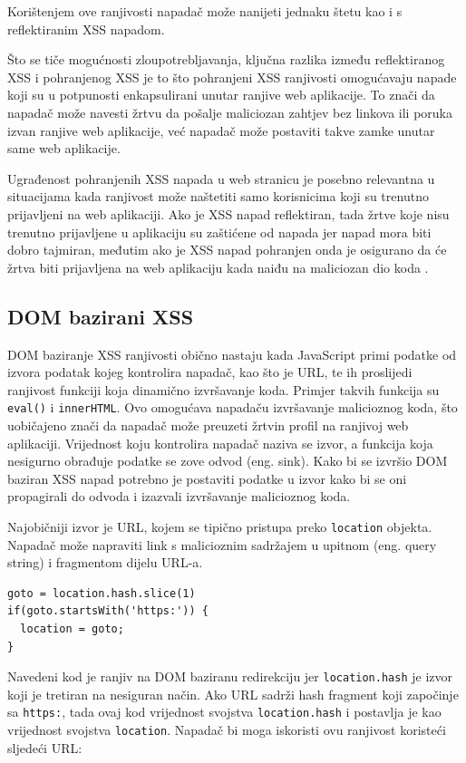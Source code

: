 \documentclass[12pt, oneside, onecolumn]{book}
\begin{document}
{Korištenjem ove ranjivosti napadač može nanijeti jednaku štetu kao i s reflektiranim XSS napadom. 

Što se tiče mogućnosti zloupotrebljavanja, ključna razlika između reflektiranog XSS i pohranjenog XSS je to što pohranjeni XSS ranjivosti omogućavaju napade koji su u potpunosti enkapsulirani unutar ranjive web aplikacije. To znači da napadač može navesti žrtvu da pošalje maliciozan zahtjev bez linkova ili poruka izvan ranjive web aplikacije, već napadač može postaviti takve zamke unutar same web aplikacije. 

Ugrađenost pohranjenih XSS napada u web stranicu je posebno relevantna u situacijama kada ranjivost može naštetiti samo korisnicima koji su trenutno prijavljeni na web aplikaciji. Ako je XSS napad reflektiran, tada žrtve koje nisu trenutno prijavljene u aplikaciju su zaštićene od napada jer napad mora biti dobro tajmiran, međutim ako je XSS napad pohranjen onda je osigurano da će žrtva biti prijavljena na web aplikaciju kada naiđu na maliciozan dio koda \cite{xssstor}.

\subsection{DOM bazirani XSS}
DOM baziranje XSS ranjivosti obično nastaju kada JavaScript primi podatke od izvora podatak kojeg kontrolira napadač, kao što je URL, te ih proslijedi ranjivost funkciji koja dinamično izvršavanje koda. Primjer takvih funkcija su \texttt{eval()} i \texttt{innerHTML}. Ovo omogućava napadaču izvršavanje malicioznog koda, što uobičajeno znači da napadač može preuzeti žrtvin profil na ranjivoj web aplikaciji. Vrijednost koju kontrolira napadač naziva se izvor, a funkcija koja nesigurno obrađuje podatke se zove odvod (eng. sink). Kako bi se izvršio DOM baziran XSS napad potrebno je postaviti podatke u izvor kako bi se oni propagirali do odvoda i izazvali izvršavanje malicioznog koda.

Najobičniji izvor je URL, kojem se tipično pristupa preko \texttt{location} objekta. Napadač može napraviti link s malicioznim sadržajem u upitnom (eng. query string) i fragmentom dijelu URL-a.

\begin{verbatim}
goto = location.hash.slice(1)
if(goto.startsWith('https:')) {
  location = goto;
}
\end{verbatim}

Navedeni kod je ranjiv na DOM baziranu redirekciju jer \texttt{location.hash} je izvor koji je tretiran na nesiguran način. Ako URL sadrži hash fragment koji započinje sa \texttt{https:}, tada ovaj kod vrijednost svojstva \texttt{location.hash} i postavlja je kao vrijednost svojstva \texttt{location}. Napadač bi moga iskoristi ovu ranjivost koristeći sljedeći URL:

}
\end{document}

